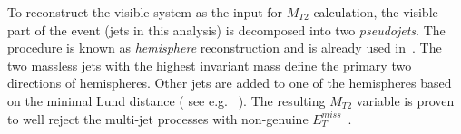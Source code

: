To reconstruct the visible system as the input for $M_{T2}$ calculation, the visible part of the event (jets in this analysis) is decomposed into two \textit{pseudojets}. The procedure is known as \textit{hemisphere} reconstruction and is already used in~\cite{CMS-PAS-SUS-12-002}. The two massless jets with the highest invariant mass define the primary two directions of hemispheres. Other jets are added to one of the hemispheres based on the minimal Lund distance ( see e.g. ~\cite{Sjostrand:2006za}). The resulting $M_{T2}$ variable is proven to well reject the multi-jet processes with non-genuine $E_{T}^{miss}$~\cite{CMS-PAS-SUS-12-002}. \\


